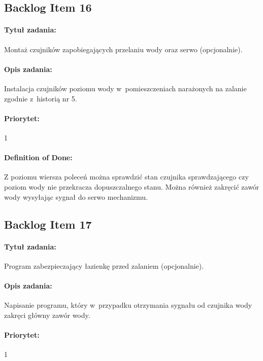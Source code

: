 	
	\subsection{Backlog Item 16}
	\paragraph{Tytuł zadania:}
	Montaż czujników zapobiegających przelaniu wody oraz serwo (opcjonalnie).
	
	\paragraph{Opis zadania:} 
	Instalacja czujników poziomu wody w~pomieszczeniach narażonych na zalanie zgodnie z~historią nr 5.
	
	\paragraph{Priorytet:} 
	1
	
	\paragraph{Definition of Done:}
	Z poziomu wiersza poleceń można sprawdzić stan czujnika sprawdzającego czy poziom wody nie przekracza dopuszczalnego stanu. Można również zakręcić zawór wody wysyłając sygnał do serwo mechanizmu.


	\subsection{Backlog Item 17}
	\paragraph{Tytuł zadania:}
	Program zabezpieczający łazienkę przed zalaniem (opcjonalnie).
	
	\paragraph{Opis zadania:} 
	Napisanie programu, który w~przypadku otrzymania sygnału od czujnika wody zakręci główny zawór wody. 
	
	\paragraph{Priorytet:} 
	1
	

